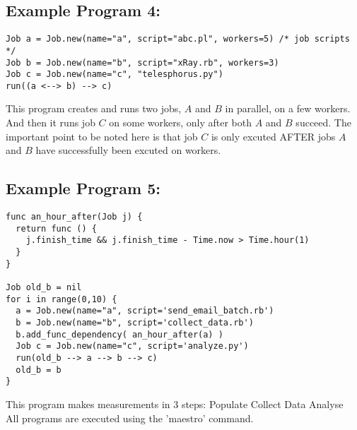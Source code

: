 \subsection*{Example Program 4:}
\begin{verbatim}
Job a = Job.new(name="a", script="abc.pl", workers=5) /* job scripts */
Job b = Job.new(name="b", script="xRay.rb", workers=3)
Job c = Job.new(name="c", "telesphorus.py")
run((a <--> b) --> c)
\end{verbatim}

This program creates and runs two jobs, $A$ and $B$ in parallel, on a few
workers. And then it runs job $C$ on some workers, only after both $A$
and $B$ succeed. The important point to be noted here is that job $C$ is 
only excuted AFTER jobs $A$ and $B$ have successfully been excuted on workers.
\\

\subsection*{Example Program 5:}
\begin{verbatim}
func an_hour_after(Job j) {
  return func () {
    j.finish_time && j.finish_time - Time.now > Time.hour(1)
  }
}

Job old_b = nil
for i in range(0,10) {
  a = Job.new(name="a", script='send_email_batch.rb')
  b = Job.new(name="b", script='collect_data.rb')
  b.add_func_dependency( an_hour_after(a) )
  Job c = Job.new(name="c", script='analyze.py')
  run(old_b --> a --> b --> c)
  old_b = b
}
\end{verbatim}
This program makes measurements in 3 steps:
Populate
Collect Data
Analyse
\\

All programs are executed using the 'maestro' command.
\\

